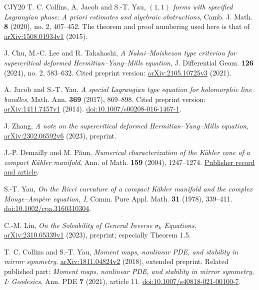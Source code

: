 \documentclass[12pt,reqno]{amsart}
\numberwithin{equation}{section}
\theoremstyle{plain}
\theoremstyle{definition}
\begin{document}
\begin{thebibliography}{CJY20}
 T. C. Collins, A. Jacob and S.-T. Yau, \emph{$(1,1)$ forms with specified Lagrangian phase: A priori estimates and algebraic obstructions}, Camb. J. Math. \textbf{8} (2020), no. 2, 407--452. The theorem and proof numbering used here is that of \href{https://arxiv.org/abs/1508.01934v1}{arXiv:1508.01934v1} (2015).

 J. Chu, M.-C. Lee and R. Takahashi, \emph{A Nakai--Moishezon type criterion for supercritical deformed Hermitian--Yang--Mills equation}, J. Differential Geom. \textbf{126} (2024), no. 2, 583--632. Cited preprint version: \href{https://arxiv.org/abs/2105.10725v3}{arXiv:2105.10725v3} (2021).

 A. Jacob and S.-T. Yau, \emph{A special Lagrangian type equation for holomorphic line bundles}, Math. Ann. \textbf{369} (2017), 869--898. Cited preprint version: \href{https://arxiv.org/abs/1411.7457v1}{arXiv:1411.7457v1} (2014). \href{https://doi.org/10.1007/s00208-016-1467-1}{doi:10.1007/s00208-016-1467-1}.

 J. Zhang, \emph{A note on the supercritical deformed Hermitian--Yang--Mills equation}, \href{https://arxiv.org/abs/2302.06592v6}{arXiv:2302.06592v6} (2023), preprint.

 J.-P. Demailly and M. P\u{a}un, \emph{Numerical characterization of the K\"ahler cone of a compact K\"ahler manifold}, Ann. of Math. \textbf{159} (2004), 1247--1274. \href{https://annals.math.princeton.edu/2004/159-3/p05}{Publisher record and article}.

 S.-T. Yau, \emph{On the Ricci curvature of a compact K\"ahler manifold and the complex Monge--Amp\`ere equation, I}, Comm. Pure Appl. Math. \textbf{31} (1978), 339--411. \href{https://doi.org/10.1002/cpa.3160310304}{doi:10.1002/cpa.3160310304}.

 C.-M. Lin, \emph{On the Solvability of General Inverse $\sigma_k$ Equations}, \href{https://arxiv.org/abs/2310.05339v1}{arXiv:2310.05339v1} (2023), preprint; especially Theorem 1.5.

 T. C. Collins and S.-T. Yau, \emph{Moment maps, nonlinear PDE, and stability in mirror symmetry}, \href{https://arxiv.org/abs/1811.04824v2}{arXiv:1811.04824v2} (2018), extended preprint. Related published part: \emph{Moment maps, nonlinear PDE, and stability in mirror symmetry, I: Geodesics}, Ann. PDE \textbf{7} (2021), article 11. \href{https://doi.org/10.1007/s40818-021-00100-7}{doi:10.1007/s40818-021-00100-7}.


\end{thebibliography}
\end{document}

